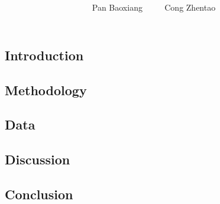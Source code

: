 \documentclass[11pt]{article}
\begin{document}

\title{ }
\date{ }
\author{Pan Baoxiang ~~~~ Cong Zhentao}
\maketitle

\newpage
\begin{abstract}
 
\end{abstract}
 


\newpage
\begin{center}
\tableofcontents
\end{center}

\newpage

\begin{center}
\section{Introduction}
\end{center}

 
 
 

\newpage 
\begin{center}
\section{Methodology}
\end{center}

 
\newpage
\begin{center}
\section{Data}
\end{center}

 
\newpage
\begin{center}
\section{Discussion}
\end{center}

 
\newpage
\begin{center}
\section{Conclusion}
\end{center}
 



\newpage
\begin{center}

\end{center}
\end{document}
